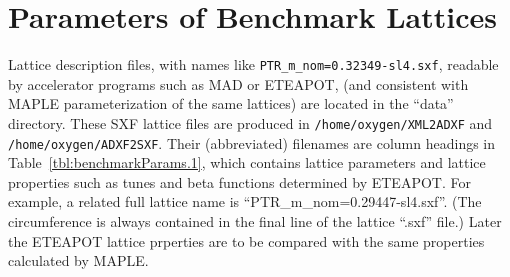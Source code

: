 \documentclass[12pt]{article}
\begin{document}
\section{Parameters of Benchmark Lattices}
Lattice description files, with names like {\tt PTR\_m\_nom=0.32349-sl4.sxf}, 
readable by accelerator programs such as MAD or ETEAPOT, (and consistent with MAPLE 
parameterization of the same lattices) are located in the ``data'' 
directory.  These SXF lattice files are produced in {\tt /home/oxygen/XML2ADXF} and 
{\tt /home/oxygen/ADXF2SXF}.  Their (abbreviated) filenames are column headings in 
Table~{\ref{tbl:benchmarkParams.1}}, which contains lattice parameters and 
lattice properties such as tunes and beta functions determined by ETEAPOT.
For example, a related full lattice name is
``PTR\_m\_nom=0.29447-sl4.sxf''.  (The circumference is always contained in the final line of the lattice
``.sxf'' file.)  Later the ETEAPOT lattice prperties are to be compared with the same properties
calculated by MAPLE.  
%
\end{document}
